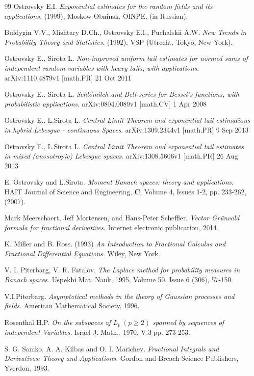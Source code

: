 \begin{thebibliography}{99}
{\sc Ostrovsky E.I.} {\it  Exponential estimates for the random fields and its applications. } (1999), Moskow-Obninsk,
OINPE,  (in Russian).

{\sc Buldygin V.V., Mishtary D.Ch., Ostrovsky E.I., Puchalskii A.W.} {\it New Trends in  Probability Theory and Statistics. }
(1992),  VSP (Utrecht, Tokyo, New York).

{\sc Ostrovsky E., Sirota L.} {\it Non-improved uniform tail estimates for normed sums of independent random variables
with heavy tails, with applications.}
arXiv:1110.4879v1 [math.PR] 21 Oct 2011

{\sc Ostrovsky E., Sirota L.}  {\it Schl\"omilch and Bell series for Bessel's functions,
with probabilistic applications. } arXiv:0804.0089v1 [math.CV] 1 Apr 2008

{\sc Ostrovsky E., L.Sirota L.} {\it  Central Limit Theorem and exponential  tail estimations in hybrid Lebesgue - continuous
Spaces.} arXiv:1309.2344v1 [math.PR] 9 Sep 2013

{\sc Ostrovsky E., L.Sirota L.}  {\it Central Limit Theorem and exponential tail estimates
in mixed (anosotropic) Lebesgue spaces.} arXiv:1308.5606v1 [math.PR] 26 Aug 2013

{\sc E. Ostrovsky and L.Sirota.} {\it Moment Banach spaces: theory and applications.}
HAIT Journal of Science and Engineering, {\bf C}, Volume 4, Issues 1-2,
pp. 233-262, (2007).

{\sc Mark Meerschaert, Jeff Mortensen, and Hans-Peter Scheffler.  } {\it Vector Gr\"unvald formula for fractional derivatives. }
 Internet electronic publication, 2014.

{\sc K. Miller and B. Ross.}  (1993) {\it An Introduction to Fractional Calculus and Fractional Differential Equations.}
 Wiley, New York.

{\sc V. I. Piterbarg, V. R. Fatalov.} {\it The Laplace method for probability measures in
Banach spaces.} Uspekhi Mat. Nauk, 1995, Volume 50, Issue 6 (306), 57-150.

{\sc V.I.Piterbarg.} {\it Asymptotical methods in the theory of Gaussian processes and fields.}
 American Mathematical Society, 1996.

{\sc Rosenthal H.P.} {\it On the subspaces of $ L_p \ (p \ge 2) $ spanned by sequences of
independent Variables.} Israel J. Math., 1970, V.3 pp. 273-253.

{\sc S. G. Samko, A. A. Kilbas and O. I. Marichev.} {\it Fractional Integrals and Derivatives:
Theory and Applications.} Gordon and Breach Science Publishers, Yverdon, 1993.



\end{thebibliography}

